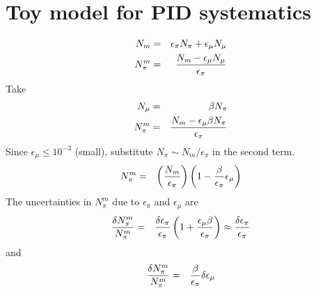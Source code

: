 \documentclass[12pt]{article}
\begin{document}
\section{Toy model for PID systematics}
\begin{eqnarray}
N_m & = & \epsilon_\pi N_\pi + \epsilon_\mu N_\mu \\
N_\pi^m & = & {N_m - \epsilon_\mu N_\mu \over \epsilon_\pi}
\end{eqnarray}
Take
\begin{eqnarray}      
N_\mu & = & \beta N_\pi \\
N_\pi^m & = & {N_m - \epsilon_\mu \beta N_\pi \over \epsilon_\pi}
\end{eqnarray}
Since $\epsilon_\mu \le 10^{-3}$ (small), substitute $N_\pi \sim N_m/\epsilon_\pi$ in the second term.
\begin{eqnarray}
N_\pi^m & = & \left(N_m \over \epsilon_\pi \right) \left(1 - { \beta \over \epsilon_\pi} \epsilon_\mu \right)
\end{eqnarray}
The uncertainties in $N_\pi^m$ due to $\epsilon_\pi$ and $\epsilon_\mu$ are
\begin{eqnarray}
\delta N_\pi^m \over N_\pi^m & = & {\delta \epsilon_\pi \over \epsilon_\pi} \left( 1 + {\epsilon_\mu \beta \over \epsilon_\pi} \right)
\approx {\delta \epsilon_\pi \over \epsilon_\pi}
\end{eqnarray}
and
\begin{eqnarray}
\delta N_\pi^m \over N_\pi^m & = & {\beta \over \epsilon_\pi} \delta \epsilon_\mu 
\end{eqnarray}
\end{document}
